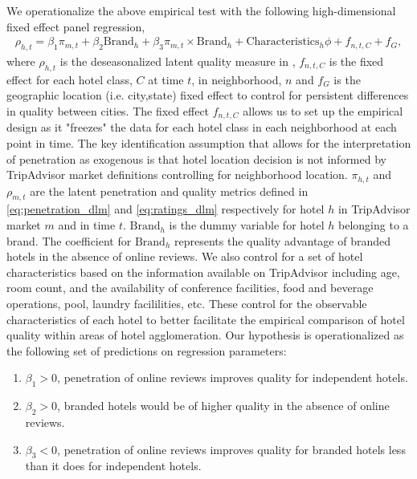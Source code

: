 \documentclass[mksc,blindrev]{informs3} %
\begin{document}
We operationalize the above empirical test with the following high-dimensional fixed effect panel regression,
\begin{equation}\label{eq:nbhd_brand}
\begin{split}
\rho_{h,t}=\beta_{1} \pi_{m,t} + \beta_{2} \text{Brand}_{h} + \beta_{3} \pi_{m,t}\times \text{Brand}_{h} + \text{Characteristics}_h\phi + f_{n,t,C}+f_{G}, %
\end{split}
\end{equation}
where $\rho_{h,t}$ is the deseasonalized latent quality measure in , $f_{n,t,C}$ is the fixed effect for each hotel class, $C$ at time $t$, in neighborhood, $n$ and $f_{G}$ is the geographic location (i.e. city,state) fixed effect to control for persistent differences in quality between cities. The fixed effect $f_{n,t,C}$ allows us to set up the empirical design as it "freezes" the data for each hotel class in each neighborhood at each point in time. The key identification assumption that allows for the interpretation of penetration as exogenous is that hotel location decision is not informed by TripAdvisor market definitions controlling for neighborhood location. $\pi_{h,t}$ and $\rho_{m,t}$ are the latent penetration and quality metrics defined in \cref{eq:penetration_dlm} and \cref{eq:ratings_dlm} respectively for hotel $h$ in TripAdvisor market $m$ and in time $t$. $\text{Brand}_h$ is the dummy variable for hotel $h$ belonging to a brand. The coefficient for $\text{Brand}_h$ represents the quality advantage of branded hotels in the absence of online reviews. We also control for a set of hotel characteristics based on the information available on TripAdvisor including age, room count, and the availability of conference facilities, food and beverage operations, pool, laundry facililities, etc. These control for the observable characteristics of each hotel to better facilitate the empirical comparison of hotel quality within areas of hotel agglomeration. Our hypothesis is operationalized as the following set of predictions on regression parameters:
\begin{enumerate}
\item $\beta_1>0$, penetration of online reviews improves quality for independent hotels.
\item $\beta_2>0$, branded hotels would be of higher quality in the absence of online reviews.
\item $\beta_3<0$, penetration of online reviews improves quality for branded hotels less than it does for independent hotels.
\end{enumerate}
\end{document}
